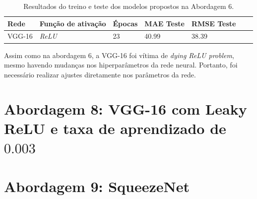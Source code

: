 \begin{table}[!ht]
	\centering
	\caption{Resultados do treino e teste dos modelos propostos na Abordagem 6.}
	\label{tab:results-2}
		\begin{tabular}{l l l l l l l}
			\toprule
			Rede & Função de ativação & Épocas & MAE Teste & RMSE Teste \\
			\midrule
			VGG-16 & \emph{ReLU} & 23 & 40.99 & 38.39 \\
			\bottomrule
		\end{tabular}
	\end{table}

	Assim como na abordagem 6, a VGG-16 foi vítima de \emph{dying ReLU problem}, mesmo havendo mudanças nos hiperparâmetros da rede neural. Portanto, foi necessário realizar ajustes diretamente nos parâmetros da rede.

\section{Abordagem 8: VGG-16 com Leaky ReLU e taxa de aprendizado de $0.003$}


\section{Abordagem 9: SqueezeNet}
